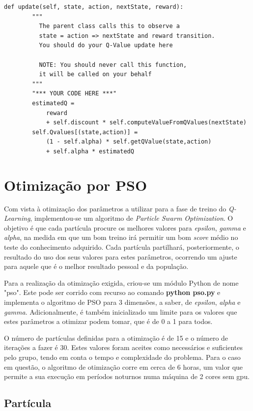 \documentclass[runningheads]{article}
\begin{document}
\begin{verbatim}
def update(self, state, action, nextState, reward):
        """
          The parent class calls this to observe a
          state = action => nextState and reward transition.
          You should do your Q-Value update here

          NOTE: You should never call this function,
          it will be called on your behalf
        """
        "*** YOUR CODE HERE ***"
        estimatedQ =
            reward
            + self.discount * self.computeValueFromQValues(nextState)
        self.Qvalues[(state,action)] =
            (1 - self.alpha) * self.getQValue(state,action)
            + self.alpha * estimatedQ
\end{verbatim}

\newpage
\section{Otimização por PSO}
\label{PSO}
Com vista à otimização dos parâmetros a utilizar para a fase de treino do \textit{Q-Learning}, implementou-se um algoritmo de \textit{Particle Swarm Optimization}. O objetivo é que cada partícula procure os melhores valores para \textit{epsilon}, \textit{gamma} e \textit{alpha}, na medida em que um bom treino irá permitir um bom \textit{score} médio no teste do conhecimento adquirido. Cada partícula partilhará, posteriormente, o resultado do uso dos seus valores para estes parâmetros, ocorrendo um ajuste para aquele que é o melhor resultado pessoal e da população.
\par Para a realização da otimização exigida, criou-se um módulo Python de nome "pso". Este pode ser corrido com recurso ao comando \textbf{python pso.py} e implementa o algoritmo de PSO para 3 dimensões, a saber, de \textit{epsilon}, \textit{alpha} e \textit{gamma}. Adicionalmente, é também inicializado um limite para os valores que estes parâmetros a otimizar podem tomar, que é de 0 a 1 para todos.
\par O número de partículas definidas para a otimização é de 15 e o número de iterações a fazer é 30. Estes valores foram aceites como necessários e suficientes pelo grupo, tendo em conta o tempo e complexidade do problema. Para o caso em questão, o algoritmo de otimização corre em cerca de 6 horas, um valor que permite a sua execução em períodos noturnos numa máquina de 2 cores sem gpu.

\subsection{Partícula}
\end{document}
